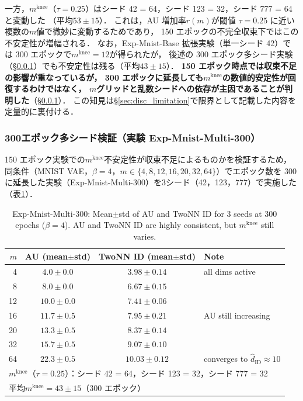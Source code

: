\documentclass[11pt,a4paper]{jsarticle}
\newcommand{\mknee}{m^{\mathrm{knee}}}
\begin{document}
一方，$\mknee$（$\tau = 0.25$）はシード 42 = 64，シード 123 = 32，シード 777 = 64 と変動した
（平均$53 \pm 15$）．
これは，AU 増加率$r(m)$が閾値 $\tau = 0.25$ に近い複数の$m$値で微妙に変動するためであり，
150 エポックの不完全収束下ではこの不安定性が増幅される．
なお，Exp-Mnist-Base 拡張実験（単一シード 42）では 300 エポックで$\mknee = 12$が得られたが，
後述の 300 エポック多シード実験（§\ref{sec:exp_multiseed2}）でも不安定性は残る（平均$43 \pm 15$）．
\textbf{150 エポック時点では収束不足の影響が重なっているが，
300 エポックに延長しても$\mknee$の数値的安定性が回復するわけではなく，
$m$グリッドと乱数シードへの依存が主因であることが判明した}（§\ref{sec:exp_multiseed2}）．
この知見は§\ref{sec:disc_limitation}で限界として記載した内容を定量的に裏付ける．

\subsubsection{300エポック多シード検証（実験 Exp-Mnist-Multi-300）}\label{sec:exp_multiseed2}

150 エポック実験での$\mknee$不安定性が収束不足によるものかを検証するため，
同条件（MNIST VAE，$\beta = 4$，$m \in \{4, 8, 12, 16, 20, 32, 64\}$）でエポック数を
300 に延長した実験（Exp-Mnist-Multi-300）を3シード（42，123，777）で実施した（表\ref{tab:e4_300ep_multiseed}）．

\begin{table}[H]
\centering
\caption{Exp-Mnist-Multi-300: Mean$\pm$std of AU and TwoNN ID for 3 seeds at 300 epochs ($\beta=4$). AU and TwoNN ID are highly consistent, but $\mknee$ still varies.}
\label{tab:e4_300ep_multiseed}
\small
\begin{tabular}{rccl}
\toprule
$m$ & AU (mean$\pm$std) & TwoNN ID (mean$\pm$std) & Note \\
\midrule
 4 & $4.0 \pm 0.0$ & $3.98 \pm 0.14$ & all dims active \\
 8 & $8.0 \pm 0.0$ & $6.67 \pm 0.15$ & \\
12 & $10.0 \pm 0.0$ & $7.41 \pm 0.06$ & \\
16 & $11.7 \pm 0.5$ & $7.95 \pm 0.21$ & AU still increasing \\
20 & $13.3 \pm 0.5$ & $8.37 \pm 0.14$ & \\
32 & $15.7 \pm 0.5$ & $9.07 \pm 0.10$ & \\
64 & $22.3 \pm 0.5$ & $10.03 \pm 0.12$ & converges to $\hat{d}_\mathrm{ID} \approx 10$ \\
\midrule
\multicolumn{4}{l}{$\mknee$（$\tau=0.25$）：シード 42 = 64，シード 123 = 32，シード 777 = 32} \\
\multicolumn{4}{l}{平均$\mknee = 43 \pm 15$（300 エポック）} \\
\bottomrule
\end{tabular}
\end{table}
\end{document}
